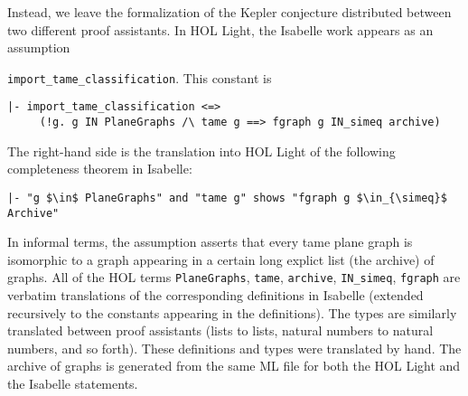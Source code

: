 Instead, we leave the formalization of the Kepler conjecture
distributed between two different proof assistants.  In HOL Light, the
Isabelle work appears as an assumption

\verb!import_tame_classification!.  This constant is 

\begin{obeylines}

\begin{verbatim}
|- import_tame_classification <=>
     (!g. g IN PlaneGraphs /\ tame g ==> fgraph g IN_simeq archive)
\end{verbatim}

\end{obeylines}

The right-hand side is the translation into HOL Light of the following
completeness theorem in Isabelle:




\begin{lstlisting}[keepspaces=true,stringstyle=\tt,basicstyle=\small,%
frame=none,framesep=8pt,mathescape,morekeywords={and,shows},columns=flexible]
|- "g $\in$ PlaneGraphs" and "tame g" shows "fgraph g $\in_{\simeq}$ Archive"
\end{lstlisting}

In informal terms, the assumption asserts that every tame plane graph
is isomorphic to a graph appearing in a certain long explict list (the
archive) of graphs.  All of the HOL terms \verb!PlaneGraphs!,
\verb!tame!, \verb!archive!, \verb!IN_simeq!, \verb!fgraph! are
verbatim translations of the corresponding definitions in Isabelle
(extended recursively to the constants appearing in the definitions).
The types are similarly translated between proof assistants (lists to
lists, natural numbers to natural numbers, and so forth).  These
definitions and types were translated by hand.  The archive of graphs
is generated from the same ML file for both the HOL Light and the
Isabelle statements.


